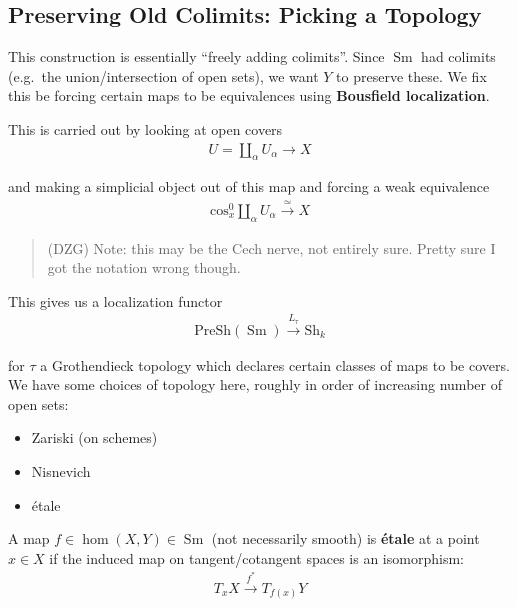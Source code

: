 \hypertarget{preserving-old-colimits-picking-a-topology}{%
\subsection{Preserving Old Colimits: Picking a
Topology}\label{preserving-old-colimits-picking-a-topology}}

This construction is essentially ``freely adding colimits''. Since
\({\operatorname{Sm}}\) had colimits (e.g.~the union/intersection of
open sets), we want \(Y\) to preserve these. We fix this be forcing
certain maps to be equivalences using \textbf{Bousfield localization}.

This is carried out by looking at open covers
\begin{align*}
U = \coprod_{\alpha} U_\alpha \to X
\end{align*}

and making a simplicial object out of this map and forcing a weak
equivalence
\begin{align*}
\text{cos}^0_x \coprod_\alpha U_\alpha \xrightarrow{\simeq} X
\end{align*}

\begin{quote}
(DZG) Note: this may be the Cech nerve, not entirely sure. Pretty sure I
got the notation wrong though.
\end{quote}

This gives us a localization functor
\begin{align*}
\mathrm{PreSh}({\operatorname{Sm}}) \xrightarrow{L_\tau} \mathrm{Sh}_k
\end{align*}

for \(\tau\) a Grothendieck topology which declares certain classes of
maps to be covers. We have some choices of topology here, roughly in
order of increasing number of open sets:

\begin{itemize}
\tightlist
\item
  Zariski (on schemes)
\item
  Nisnevich
\item
  étale
\end{itemize}

\begin{definition}

A map \(f\in \hom(X,Y) \in {\operatorname{Sm}}\) (not necessarily
smooth) is \textbf{étale} at a point \(x\in X\) if the induced map on
tangent/cotangent spaces is an isomorphism:
\begin{align*}
T_x X \xrightarrow{f^*} T_{f(x)}Y
\end{align*}

\end{definition}

